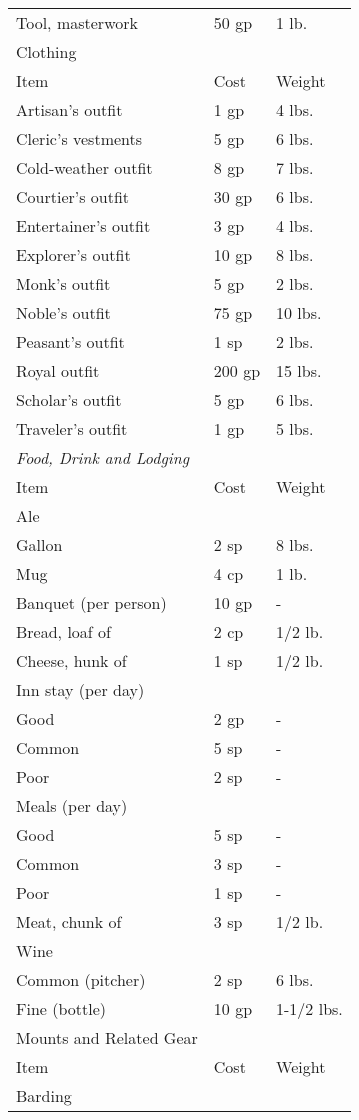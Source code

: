 \begin{table}[]
\begin{tabular}{lll}
 Tool, masterwork & 50 gp & 1 lb.\\
Clothing \\
 Item & Cost & Weight\\
Artisan's outfit & 1 gp & 4 lbs. \\
 Cleric's vestments & 5 gp & 6 lbs. \\
 Cold-weather outfit & 8 gp & 7 lbs. \\
 Courtier's outfit & 30 gp & 6 lbs. \\
 Entertainer's outfit & 3 gp & 4 lbs. \\
 Explorer's outfit & 10 gp & 8 lbs. \\
 Monk's outfit & 5 gp & 2 lbs. \\
 Noble's outfit & 75 gp & 10 lbs. \\
 Peasant's outfit & 1 sp & 2 lbs. \\
 Royal outfit & 200 gp & 15 lbs. \\
 Scholar's outfit & 5 gp & 6 lbs. \\
 Traveler's outfit & 1 gp & 5 lbs.\\
\textit{Food, Drink and Lodging}  \\
 Item & Cost & Weight\\
Ale  \\
 Gallon & 2 sp & 8 lbs. \\
 Mug & 4 cp & 1 lb. \\
 Banquet (per person) & 10 gp & - \\
 Bread, loaf of & 2 cp & 1/2 lb. \\
 Cheese, hunk of & 1 sp & 1/2 lb. \\
 Inn stay (per day)  \\
 Good & 2 gp & - \\
 Common & 5 sp & - \\
 Poor & 2 sp & - \\
 Meals (per day)  \\
 Good & 5 sp & - \\
 Common & 3 sp & - \\
 Poor & 1 sp & - \\
 Meat, chunk of & 3 sp & 1/2 lb. \\
 Wine  \\
 Common (pitcher) & 2 sp & 6 lbs. \\
 Fine (bottle) & 10 gp & 1-1/2 lbs.\\
Mounts and Related Gear  \\
 Item & Cost & Weight\\
Barding  \\

\end{tabular}
\end{table}
